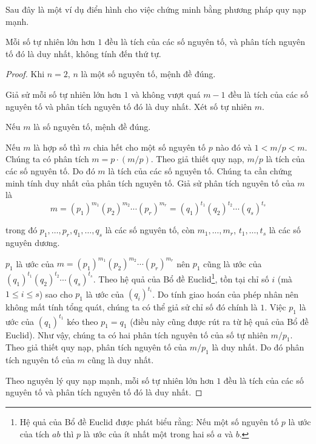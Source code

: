 Sau đây là một ví dụ điển hình cho việc chứng minh bằng phương pháp quy nạp mạnh.

\begin{example}
    Mỗi số tự nhiên lớn hơn $1$ đều là tích của các số nguyên tố, và phân tích nguyên tố đó là duy nhất, không tính đến thứ tự.
\end{example}

\begin{proof}
    Khi $n = 2$, $n$ là một số nguyên tố, mệnh đề đúng.

    Giả sử mỗi số tự nhiên lớn hơn $1$ và không vượt quá $m - 1$ đều là tích của các số nguyên tố và phân tích nguyên tố đó là duy nhất. Xét số tự nhiên $m$.

    Nếu $m$ là số nguyên tố, mệnh đề đúng.

    Nếu $m$ là hợp số thì $m$ chia hết cho một số nguyên tố $p$ nào đó và $1 < m/p < m$. Chúng ta có phân tích $m = p\cdot (m/p)$. Theo giả thiết quy nạp, $m/p$ là tích của các số nguyên tố. Do đó $m$ là tích của các số nguyên tố. Chúng ta cần chứng minh tính duy nhất của phân tích nguyên tố. Giả sử phân tích nguyên tố của $m$ là
    \[
        m = {(p_{1})}^{m_{1}}{(p_{2})}^{m_{2}}\cdots {(p_{r})}^{m_{r}} = {(q_{1})}^{t_{1}}{(q_{2})}^{t_{2}}\cdots {(q_{s})}^{t_{s}}
    \]

    trong đó $p_{1}, \ldots, p_{r}, q_{1}, \ldots, q_{s}$ là các số nguyên tố, còn $m_{1}, \ldots, m_{r}$, $t_{1}, \ldots, t_{s}$ là các số nguyên dương.

    $p_{1}$ là ước của $m = {(p_{1})}^{m_{1}}{(p_{2})}^{m_{2}}\cdots {(p_{r})}^{m_{r}}$ nên $p_{1}$ cũng là ước của ${(q_{1})}^{t_{1}}{(q_{2})}^{t_{2}}\cdots {(q_{s})}^{t_{s}}$. Theo hệ quả của Bổ đề Euclid\footnote{Hệ quả của Bổ đề Euclid được phát biểu rằng: Nếu một số nguyên tố $p$ là ước của tích $ab$ thì $p$ là ước của ít nhất một trong hai số $a$ và $b$.}, tồn tại chỉ số $i$ (mà $1\leq i\leq s$) sao cho $p_{1}$ là ước của ${(q_{i})}^{t_{i}}$. Do tính giao hoán của phép nhân nên không mất tính tổng quát, chúng ta có thể giả sử chỉ số đó chính là $1$. Việc $p_{1}$ là ước của ${(q_{1})}^{t_{1}}$ kéo theo $p_{1} = q_{1}$ (điều này cũng được rút ra từ hệ quả của Bổ đề Euclid). Như vậy, chúng ta có hai phân tích nguyên tố của số tự nhiên $m/p_{1}$. Theo giả thiết quy nạp, phân tích nguyên tố của $m/p_{1}$ là duy nhất. Do đó phân tích nguyên tố của $m$ cũng là duy nhất.

    Theo nguyên lý quy nạp mạnh, mỗi số tự nhiên lớn hơn $1$ đều là tích của các số nguyên tố và phân tích nguyên tố đó là duy nhất.
\end{proof}

